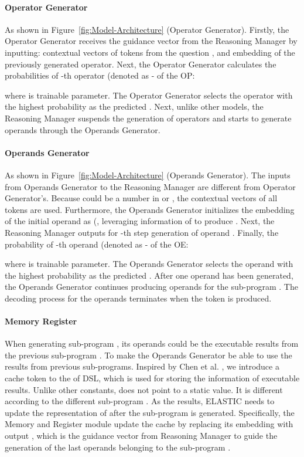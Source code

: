 \documentclass{article}
\begin{document}
\paragraph{Operator Generator}

As shown in Figure~\ref{fig:Model-Architecture} (Operator Generator). Firstly, the Operator Generator receives the guidance vector  from the Reasoning Manager by inputting: contextual vectors  of tokens from the question , and embedding  of the previously generated operator. Next, the Operator Generator calculates the probabilities of -th operator (denoted as - of the OP:



where  is trainable parameter. The Operator Generator selects the operator with the highest probability as the predicted . Next, unlike other models, the Reasoning Manager suspends the generation of operators and starts to generate operands  through the Operands Generator.

\paragraph{Operands Generator}

As shown in Figure~\ref{fig:Model-Architecture} (Operands Generator). The inputs from Operands Generator to the Reasoning Manager are different from Operator Generator's. Because  could be a number in  or , the contextual vectors  of all tokens are used. Furthermore, the Operands Generator initializes the embedding of the initial operand  as  (, leveraging information of  to produce . Next, the Reasoning Manager outputs  for -th step generation of operand . Finally, the probability of -th operand (denoted as - of the OE:



where  is trainable parameter. The Operands Generator selects the operand with the highest probability as the predicted . After one operand has been generated, the Operands Generator continues producing operands for the sub-program . The decoding process for the operands terminates when the token  is produced.

\paragraph{Memory Register}
\label{section: memory_register}

When generating sub-program , its operands could be the executable results from the previous sub-program . To make the Operands Generator be able to use the results from previous sub-programs. Inspired by Chen et al. \cite{finqa}, we introduce a cache token  to the  of DSL, which is used for storing the information of executable results. Unlike other constants,  does not point to a static value. It is different according to the different sub-program . As the results, ELASTIC needs to update the representation of  after the sub-program  is generated. Specifically, the Memory and Register module update the cache  by replacing its embedding with output , which is the guidance vector from Reasoning Manager to guide the generation of the last operands belonging to the sub-program .
\end{document}
